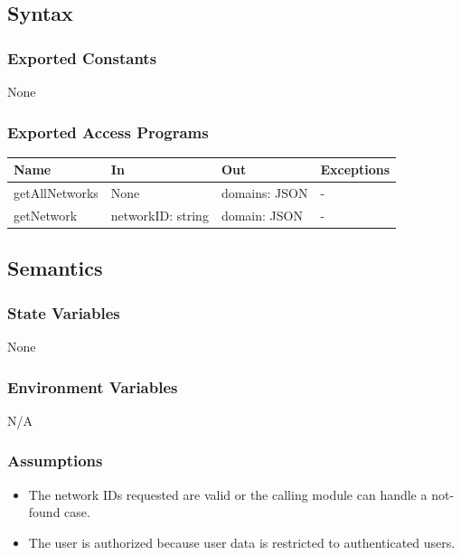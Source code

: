 \documentclass[12pt, titlepage]{article}
\begin{document}
\subsection{Syntax}

\subsubsection{Exported Constants}

None

\subsubsection{Exported Access Programs}

\begin{center}
\begin{tabular}{p{3cm} p{4cm} p{4cm} p{2cm}}
\hline
\textbf{Name} & \textbf{In} & \textbf{Out} & \textbf{Exceptions} \\
\hline
getAllNetworks & None & domains: JSON & - \\
getNetwork & networkID: string &  domain: JSON & - \\ 
\hline
\end{tabular}
\end{center}

\subsection{Semantics}

\subsubsection{State Variables}

None

\subsubsection{Environment Variables}

N/A

\subsubsection{Assumptions}

\begin{itemize}
  \item The network IDs requested are valid or the calling module can handle a not-found case.
  \item The user is authorized because user data is restricted to authenticated users.
\end{itemize}
\end{document}
